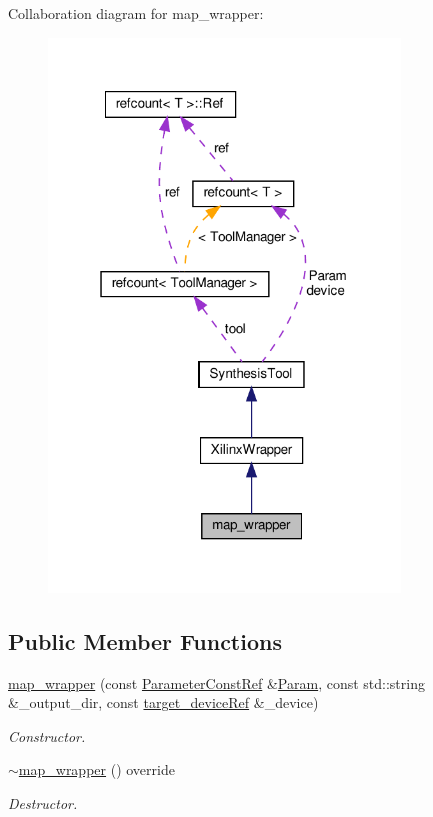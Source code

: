 Collaboration diagram for map\+\_\+wrapper\+:
\nopagebreak
\begin{figure}[H]
\begin{center}
\leavevmode
\includegraphics[width=265pt]{d0/dad/classmap__wrapper__coll__graph}
\end{center}
\end{figure}
\subsection*{Public Member Functions}
\begin{DoxyCompactItemize}
\item 
\hyperlink{classmap__wrapper_a6668af09ee3313be9012e8ea4f628141}{map\+\_\+wrapper} (const \hyperlink{Parameter_8hpp_a37841774a6fcb479b597fdf8955eb4ea}{Parameter\+Const\+Ref} \&\hyperlink{classSynthesisTool_a854ef102782ff4d069e1aa6d1a94d64e}{Param}, const std\+::string \&\+\_\+output\+\_\+dir, const \hyperlink{target__device_8hpp_acedb2b7a617e27e6354a8049fee44eda}{target\+\_\+device\+Ref} \&\+\_\+device)
\begin{DoxyCompactList}\small\item\em Constructor. \end{DoxyCompactList}\item 
\hyperlink{classmap__wrapper_a5d4f96f4531ad0dfc8634d1a23581557}{$\sim$map\+\_\+wrapper} () override
\begin{DoxyCompactList}\small\item\em Destructor. \end{DoxyCompactList}\end{DoxyCompactItemize}

